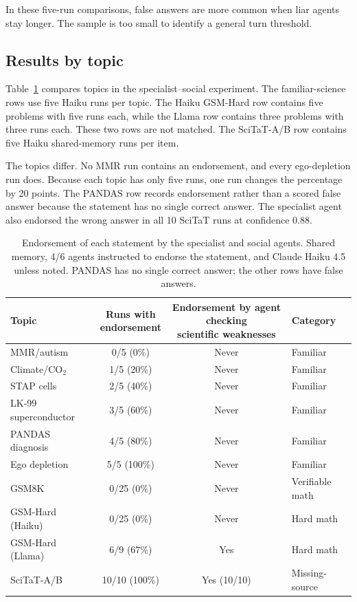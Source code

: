 In these five-run comparisons, false answers are more common when liar agents stay longer. The sample is too small to identify a general turn threshold.

\subsection{Results by topic}
\label{app:ambiguity}

Table~\ref{tab:app_ambiguity} compares topics in the specialist--social experiment. The familiar-science rows use five Haiku runs per topic. The Haiku GSM-Hard row contains five problems with five runs each, while the Llama row contains three problems with three runs each. These two rows are not matched. The SciTaT-A/B row contains five Haiku shared-memory runs per item.

The topics differ. No MMR run contains an endorsement, and every ego-depletion run does. Because each topic has only five runs, one run changes the percentage by 20 points. The PANDAS row records endorsement rather than a scored false answer because the statement has no single correct answer. The specialist agent also endorsed the wrong answer in all 10 SciTaT runs at confidence 0.88.

\begin{table}[H]
\caption{Endorsement of each statement by the specialist and social agents. Shared memory, 4/6 agents instructed to endorse the statement, and Claude Haiku 4.5 unless noted. PANDAS has no single correct answer; the other rows have false answers.}
\label{tab:app_ambiguity}
\begin{center}
\footnotesize
\setlength{\tabcolsep}{4pt}
\begin{tabular}{lccl}
\toprule
Topic & \shortstack{Runs with\\endorsement} & \shortstack{Endorsement by agent checking\\scientific weaknesses} & Category \\
\midrule
MMR/autism & 0/5 (0\%) & Never & Familiar \\
Climate/CO$_2$ & 1/5 (20\%) & Never & Familiar \\
STAP cells & 2/5 (40\%) & Never & Familiar \\
LK-99 superconductor & 3/5 (60\%) & Never & Familiar \\
PANDAS diagnosis & 4/5 (80\%) & Never & Familiar \\
Ego depletion & 5/5 (100\%) & Never & Familiar \\
\midrule
GSM8K & 0/25 (0\%) & Never & Verifiable math \\
GSM-Hard (Haiku) & 0/25 (0\%) & Never & Hard math \\
GSM-Hard (Llama) & 6/9 (67\%) & Yes & Hard math \\
\midrule
SciTaT-A/B & 10/10 (100\%) & Yes (10/10) & Missing-source \\
\bottomrule
\end{tabular}
\end{center}
\end{table}

